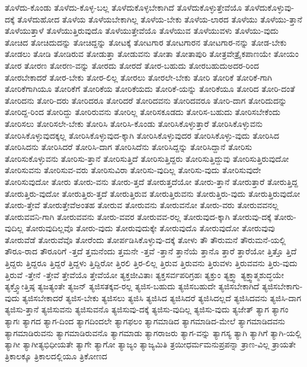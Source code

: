 {ತೊಳೆದು-ಕೊಂಡು
ತೊಳೆದು-ಕೊಳ್ಳ-ಬಲ್ಲ
ತೊಳೆದುಕೊಳ್ಳಬೇಕಾಗಿದೆ
ತೊಳೆದುಕೊಳ್ಳುತ್ತೇವೆಯೊ
ತೊಳೆದುಕೊಳ್ಳುವು-ದಕ್ಕೆ
ತೊಳೆದುಹೋದ
ತೊಳೆಯ
ತೊಳೆಯಬೇಕಾಗಿಲ್ಲ
ತೊಳೆಯ-ಬೇಕು
ತೊಳೆಯ-ಲಾರದ
ತೊಳೆಯು
ತೊಳೆಯು-ತ್ತಾನೆ
ತೊಳೆಯುತ್ತಾಳೆ
ತೊಳೆಯುತ್ತಿರುವುದೊ
ತೊಳೆಯುತ್ತೇವೆಯೊ
ತೊಳೆಯುವ
ತೊಳೆಯುವಳು
ತೊಳೆಯು-ವುದು
ತೋಚಿದ
ತೋಚಿದುದನ್ನು
ತೋಚಿದ್ದನ್ನು
ತೋಟಕ್ಕೆ
ತೋಟಗಾರ
ತೋಟಗಾರನ
ತೋಟಗಾರ-ನನ್ನು
ತೋಡ-ಬೇಕು
ತೋಡಲು
ತೋಡಿ
ತೋಡಿರುವ
ತೋಡುತ್ತಾ
ತೋಡುವನು
ತೋತಾ
ತೋತಾಪುರಿ
ತೋತ್ರವೇತ್ರೈಕಪಾಣಯೇ
ತೋಯಂ
ತೋರ
ತೋರಣ
ತೋರಣ-ವನ್ನು
ತೋರದು
ತೋರದೆ
ತೋರ-ಬಹುದು
ತೋರಬಹುದುಅದರ-ರಿಂದ
ತೋರಬೇಕಾದರೆ
ತೋರ-ಬೇಕು
ತೋರ-ಲಿಲ್ಲ
ತೋರಲು
ತೋರಲೇ-ಬೇಕು
ತೋರಿ
ತೋರಿಕೆ
ತೋರಿಕೆ-ಗಾಗಿ
ತೋರಿಕೆಗಾಗಿಯೂ
ತೋರಿಕೆಗೆ
ತೋರಿಕೆಯ
ತೋರಿಕೆಯದು
ತೋರಿಕೆ-ಯನ್ನು
ತೋರಿಕೆಯೂ
ತೋರಿದ
ತೋರಿ-ದಂತೆ
ತೋರಿದನು
ತೋರಿ-ದರು
ತೋರಿದರೂ
ತೋರಿದರೆ
ತೋರಿದವನು
ತೋರಿದವರೂ
ತೋರಿ-ದಾಗ
ತೋರಿದುದನ್ನು
ತೋರಿದ್ದ-ರಿಂದ
ತೋರಿದ್ದು
ತೋರಿರುವನು
ತೋರಿಲ್ಲ
ತೋರಿಸಕೂಡದು
ತೋರಿಸ-ಬಹುದು
ತೋರಿಸಬೇಕೆಂದು
ತೋರಿಸಲು
ತೋರಿಸಲೇ-ಬೇಕು
ತೋರಿಸಿ
ತೋರಿಸಿ-ಕೊಂಡು
ತೋರಿಸಿಕೊಳ್ಳುತ್ತಾರೆ
ತೋರಿಸಿಕೊಳ್ಳುವನು
ತೋರಿಸಿಕೊಳ್ಳುವುದಕ್ಕಲ್ಲ
ತೋರಿಸಿಕೊಳ್ಳುವುದ-ಕ್ಕಾಗಿ
ತೋರಿಸಿಕೊಳ್ಳುವುದರ
ತೋರಿಸಿಕೊಳ್ಳು-ವುದು
ತೋರಿಸಿದ
ತೋರಿಸಿದನು
ತೋರಿಸಿದರೆ
ತೋರಿಸಿ-ದಾಗ
ತೋರಿಸಿದೆನು
ತೋರಿಸಿದ್ದನ್ನು
ತೋರಿಸಿದ್ದಾನೆ
ತೋರಿಸು
ತೋರಿಸುಕೊಳ್ಳುವನು
ತೋರಿಸು-ತ್ತಾನೆ
ತೋರಿಸುತ್ತಿದೆ
ತೋರಿಸುತ್ತಿದ್ದರು
ತೋರಿಸುತ್ತಿದ್ದುವು
ತೋರಿಸುತ್ತಿರುವುದೋ
ತೋರಿಸುವನು
ತೋರಿಸುವ-ವರು
ತೋರಿಸುವಿರಾ
ತೋರಿಸು-ವುದಿಲ್ಲ
ತೋರಿಸು-ವುದು
ತೋರಿಸುವುದೇ
ತೋರಿಸುವುದೋ
ತೋರು
ತೋರು-ವನು
ತೋರು-ತ್ತದೆ
ತೋರುತ್ತದೆಯೋ
ತೋರು-ತ್ತಾನೆ
ತೋರುತ್ತಾರೆ
ತೋರುತ್ತಿದ್ದ
ತೋರುತ್ತಿರು-ವುದೋ
ತೋರುತ್ತಿರು-ತ್ತದೆ
ತೋರುತ್ತಿರುವ
ತೋರುತ್ತಿರುವನು
ತೋರುತ್ತಿರು-ವುದು
ತೋರುತ್ತಿರುವುದೋ
ತೋರು-ತ್ತೇವೆ
ತೋರುತ್ತೇವೆಅಂತಹ
ತೋರುವ
ತೋರುವನು
ತೋರುವನೋ
ತೋರು-ವರು
ತೋರುವವನಲ್ಲ
ತೋರುವವನಿ-ಗಾಗಿ
ತೋರುವವನು
ತೋರು-ವವರ
ತೋರುವವ-ರಲ್ಲ
ತೋರುವುದ-ಕ್ಕಾಗಿ
ತೋರುವು-ದಕ್ಕೆ
ತೋರು-ವುದಿಲ್ಲ
ತೋರುವುದಿಲ್ಲವೊ
ತೋರು-ವುದು
ತೋರುವುದುಕ್ಕೇ
ತೋರುವುದೊ
ತೋರುವುದೋ
ತೋರುವುವು
ತೋರುವೆಡೆ
ತೋರುವೆವೊ
ತೋರೆಂದು
ತೋರ್ಪಡಿಸಿಕೊಳ್ಳುವು-ದಕ್ಕೆ
ತೋಳು
ತೌ
ತೌರುಮನೆ
ತೌರುಮನೆ-ಯಲ್ಲಿ
ತೌರೂ-ರಾದ
ತೌರೂರಿಗೆ
-ತ್ತದೆ
ತ್ತಮನೆಂದು
ತ್ತಮನೇ
-ತ್ತವೆ
-ತ್ತಾನೆ
ತ್ತಾನೆಯೆ
ತ್ತಾನೊ
ತ್ತಾರೆ
ತ್ತಾರೆಯೋ
ತ್ತಿತ್ತೊ
ತ್ತಿದೆ
ತ್ತಿದ್ದರು
ತ್ತಿದ್ದರೂ
ತ್ತಿದ್ದರೆ
ತ್ತಿದ್ದಳು
ತ್ತಿದ್ದಿರೋ
ತ್ತಿರಲಿ
ತ್ತಿರ-ಲಿಲ್ಲ
ತ್ತಿರುವ
ತ್ತಿರುವನು
ತ್ತಿರುವಳು
ತ್ತಿರುವವನು
ತ್ತಿರು-ವುದು
ತ್ತಿರುವೆ
-ತ್ತೇನೆ
-ತ್ತೇವೆ
ತ್ತೇವೆಯೊ
ತ್ತೇವೆಯೋ
ತ್ಯಕ್ತಜೀವಿತಾಃ
ತ್ಯಕ್ತಸರ್ವಪರಿಗ್ರಹಃ
ತ್ಯಕ್ತುಂ
ತ್ಯಕ್ತ್ವಾ
ತ್ಯಕ್ತ್ವಾತ್ಮಶುದ್ಧಯೇ
ತ್ಯಕ್ತ್ವೋತ್ತಿಷ್ಠ
ತ್ಯಜತ್ಯಂತೇ
ತ್ಯಜನ್
ತ್ಯಜಿಸತಕ್ಕವ-ರಲ್ಲ
ತ್ಯಜಿಸ-ಬಹುದು
ತ್ಯಜಿಸಬಹುದೇ
ತ್ಯಜಿಸಬೇಕಾಗಿದೆ
ತ್ಯಜಿಸಬೇಕಾಗು-ವುದು
ತ್ಯಜಿಸಬೇಕಾದರೆ
ತ್ಯಜಿಸ-ಬೇಕು
ತ್ಯಜಿಸಲು
ತ್ಯಜಿಸಿ
ತ್ಯಜಿಸಿದ
ತ್ಯಜಿಸಿದರೆ
ತ್ಯಜಿಸಿದಲ್ಲದೆ
ತ್ಯಜಿಸಿದವನು
ತ್ಯಜಿಸಿ-ದಾಗ
ತ್ಯಜಿಸು-ತ್ತಾನೆ
ತ್ಯಜಿಸುವನು
ತ್ಯಜಿಸುವನೊ
ತ್ಯಜಿಸುವು-ದಕ್ಕೆ
ತ್ಯಜಿಸು-ವುದಿಲ್ಲ
ತ್ಯಜಿಸು-ವುದು
ತ್ಯಜೇತ್
ತ್ಯಾಗ
ತ್ಯಾಗಂ
ತ್ಯಾಗಃ
ತ್ಯಾಗದ
ತ್ಯಾಗ-ದಿಂದ
ತ್ಯಾಗದಿಂದಲೇ
ತ್ಯಾಗಫಲಂ
ತ್ಯಾಗಮಾಡಿದ
ತ್ಯಾಗಮಾಡಿದ-ಮೇಲೆ
ತ್ಯಾಗಮಾಡಿದವನು
ತ್ಯಾಗಮಾಡಿರುವನು
ತ್ಯಾಗಮಾಡಿರುವನೊ
ತ್ಯಾಗಮಾಡು
ತ್ಯಾಗರಾಜರು
ತ್ಯಾಗ-ವನ್ನು
ತ್ಯಾಗಸ್ಯ
ತ್ಯಾಗಿ
ತ್ಯಾಗಿಗೆ
ತ್ಯಾಗಿ-ಯಲ್ಲಿ
ತ್ಯಾಗೀ
ತ್ಯಾಗೀತ್ಯಭಿಧೀಯತೇ
ತ್ಯಾಗೇ
ತ್ಯಾಗೋ
ತ್ಯಾಜ್ಯಂ
ತ್ಯಾಜ್ಯಮಿತಿ
ತ್ರಯೀಧರ್ಮಮನುಪ್ರಪನ್ನಾ
ತ್ರಾಣ-ವಿಲ್ಲ
ತ್ರಾಯತೇ
ತ್ರಿಕಾಲಕ್ಕೂ
ತ್ರಿಕಾಲದಲ್ಲಿಯೂ
ತ್ರಿಕೋಣದ
}
